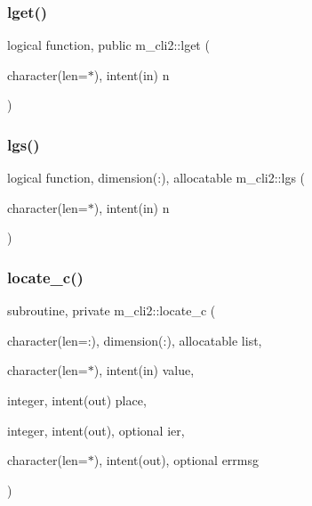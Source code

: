 \subsubsection{\texorpdfstring{lget()}{lget()}}
{\footnotesize\ttfamily logical function, public m\+\_\+cli2\+::lget (\begin{DoxyParamCaption}\item[{character(len=$\ast$), intent(in)}]{n }\end{DoxyParamCaption})}

\mbox{\label{namespacem__cli2_a4cda9acefdf56b45483ea41b73494c8d}} 
\subsubsection{\texorpdfstring{lgs()}{lgs()}}
{\footnotesize\ttfamily logical function, dimension(\+:), allocatable m\+\_\+cli2\+::lgs (\begin{DoxyParamCaption}\item[{character(len=$\ast$), intent(in)}]{n }\end{DoxyParamCaption})\hspace{0.3cm}{\ttfamily [private]}}

\mbox{\label{namespacem__cli2_a2199778fea512efcde8778f20765643a}} 
\subsubsection{\texorpdfstring{locate\+\_\+c()}{locate\_c()}}
{\footnotesize\ttfamily subroutine, private m\+\_\+cli2\+::locate\+\_\+c (\begin{DoxyParamCaption}\item[{character(len=\+:), dimension(\+:), allocatable}]{list,  }\item[{character(len=$\ast$), intent(in)}]{value,  }\item[{integer, intent(out)}]{place,  }\item[{integer, intent(out), optional}]{ier,  }\item[{character(len=$\ast$), intent(out), optional}]{errmsg }\end{DoxyParamCaption})\hspace{0.3cm}{\ttfamily [private]}}



